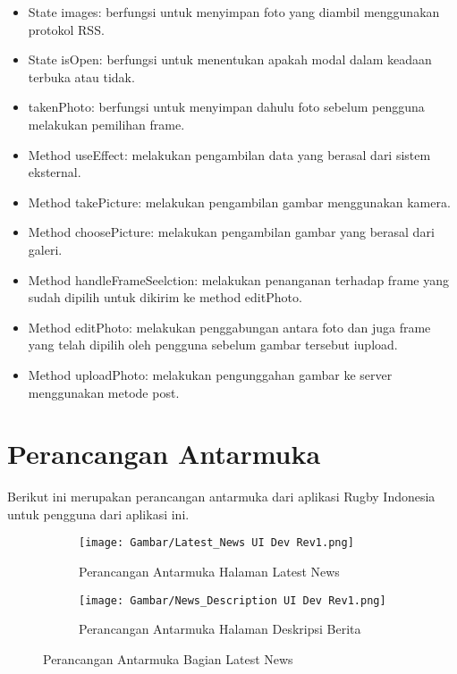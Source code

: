 \begin{enumerate}
    \begin{itemize}
        \item State images: berfungsi untuk menyimpan foto yang diambil menggunakan protokol RSS.
        \item State isOpen: berfungsi untuk menentukan apakah modal dalam keadaan terbuka atau tidak.
        \item takenPhoto: berfungsi untuk menyimpan dahulu foto sebelum pengguna melakukan pemilihan frame.
        \item Method useEffect: melakukan pengambilan data yang berasal dari sistem eksternal.
        \item Method takePicture: melakukan pengambilan gambar menggunakan kamera.
        \item Method choosePicture: melakukan pengambilan gambar yang berasal dari galeri.
        \item Method handleFrameSeelction: melakukan penanganan terhadap frame yang sudah dipilih untuk dikirim ke method editPhoto.
        \item Method editPhoto: melakukan penggabungan antara foto dan juga frame yang telah dipilih oleh pengguna sebelum gambar tersebut iupload.
        \item Method uploadPhoto: melakukan pengunggahan gambar ke server menggunakan metode post.
    \end{itemize}
    
\end{enumerate}

\section{Perancangan Antarmuka}

Berikut ini merupakan perancangan antarmuka dari aplikasi Rugby Indonesia untuk pengguna dari aplikasi ini.

\begin{figure}[H]
     \centering
     \begin{subfigure}[b]{0.3\textwidth}
        \centering
        \texttt{[image: Gambar/Latest\_News UI Dev Rev1.png]}
        \caption{Perancangan Antarmuka Halaman Latest News}
        \label{fig:latest-news-ui-dev}
     \end{subfigure}
     \hspace*{0.5in}
     \begin{subfigure}[b]{0.3\textwidth}
        \centering
        \texttt{[image: Gambar/News\_Description UI Dev Rev1.png]}
        \caption{Perancangan Antarmuka Halaman Deskripsi Berita}
        \label{fig:news-description-ui-dev}
     \end{subfigure}
        \caption{Perancangan Antarmuka Bagian Latest News}
        \label{fig:latest-news-page-full-design}
\end{figure}

